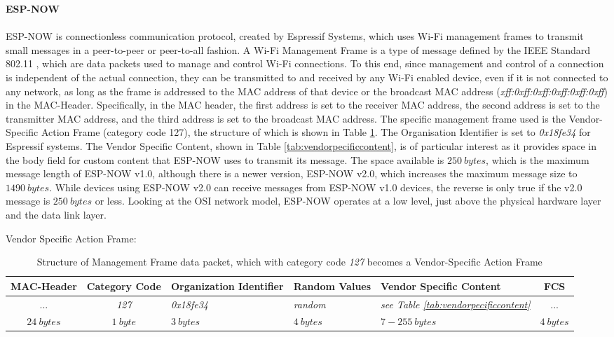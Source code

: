 \textbf{ESP-NOW}\\\\
ESP-NOW is connectionless communication protocol, created by Espressif Systems, which uses Wi-Fi management frames to transmit small messages in a peer-to-peer or peer-to-all fashion. A Wi-Fi Management Frame is a type of message defined by the IEEE Standard 802.11 \citep{noauthor_ieee_2024-1}, which are data packets used to manage and control Wi-Fi connections. To this end, since management and control of a connection is independent of the actual connection, they can be transmitted to and received by any Wi-Fi enabled device, even if it is not connected to any network, as long as the frame is addressed to the MAC address of that device or the broadcast MAC address (\textit{xff:0xff:0xff:0xff:0xff:0xff}) in the MAC-Header. Specifically, in the MAC header, the first address is set to the receiver MAC address, the second address is set to the transmitter MAC address, and the third address is set to the broadcast MAC address. The specific management frame used is the Vendor-Specific Action Frame (category code 127), the structure of which is shown in Table \ref{tab:managementframe}. The Organisation Identifier is set to \textit{0x18fe34} for Espressif systems. The Vendor Specific Content, shown in Table \ref{tab:vendorpecificcontent}, is of particular interest as it provides space in the body field for custom content that ESP-NOW uses to transmit its message. The space available is $250\ bytes$, which is the maximum message length of ESP-NOW v1.0, although there is a newer version, ESP-NOW v2.0, which increases the maximum message size to $1490\ bytes$. While devices using ESP-NOW v2.0 can receive messages from ESP-NOW v1.0 devices, the reverse is only true if the v2.0 message is $250\ bytes$ or less. Looking at the OSI network model, ESP-NOW operates at a low level, just above the physical hardware layer and the data link layer.

\begin{table}[H]
    \centering
    Vendor Specific Action Frame:
    \begin{tabular}{|c|c|>{\centering\arraybackslash}m{70pt}|>{\centering\arraybackslash}m{60pt}|>{\centering\arraybackslash}m{70pt}|c|}
        \hline
        \textbf{MAC-Header} & \textbf{Category Code} & \textbf{Organization Identifier} & \textbf{Random Values} & \textbf{Vendor Specific Content} & \textbf{FCS} \\
        \hline\hline
        ... & \textit{127} & \textit{0x18fe34} & \textit{random} & \textit{see Table \ref{tab:vendorpecificcontent}} & ... \\
        \hline\hline
        $24\ bytes$ & $1\ byte$ & $3\ bytes$ & $4\ bytes$ & $7-255\ bytes$ & $4\ bytes$ \\
        \hline
    \end{tabular}
    \vspace{\ftspace}
    \caption{Structure of Management Frame data packet, which with category code \textit{127} becomes a Vendor-Specific Action Frame \citep[adapted from][]{espressif_systems_esp-now_nodate}}
    \label{tab:managementframe}
\end{table}

